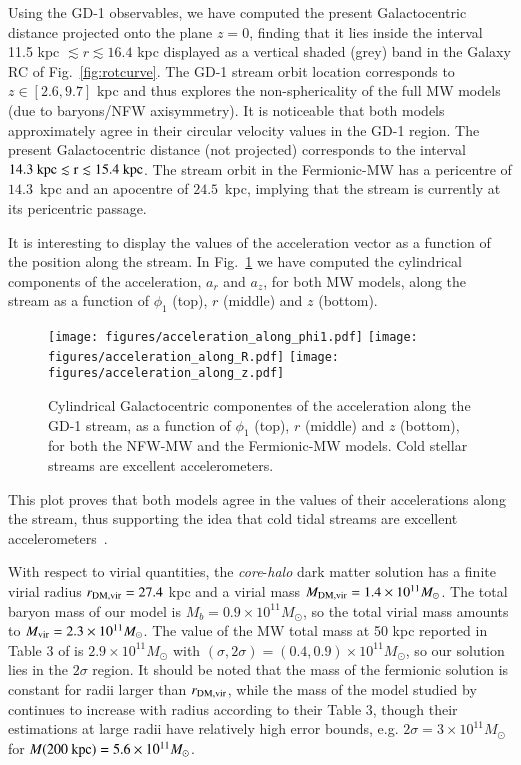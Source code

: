 \documentclass[twocolumn]{aa}
\begin{document}
Using the GD-1 observables, we have computed the present Galactocentric distance projected onto the plane $z=0$, finding that it lies inside the interval 11.5 kpc $\lesssim r \lesssim 16.4$ kpc displayed as a vertical shaded (grey) band in the Galaxy RC of Fig.~\ref{fig:rotcurve}. The GD-1 stream orbit location corresponds to $z\in [2.6, 9.7]$ kpc and thus explores the non-sphericality of the full MW models (due to baryons/NFW axisymmetry).
It is noticeable that both models approximately agree in their circular velocity values in the GD-1 region.
The present Galactocentric distance (not projected) corresponds to the interval $14.3~\rm{kpc} \lesssim r \lesssim 15.4~\rm{kpc}$. The stream orbit in the Fermionic-MW has a pericentre of $14.3$~kpc and an apocentre
of $24.5$~kpc, implying that the stream is currently at its pericentric passage.

It is interesting to display the values of the acceleration vector as a function of the position along the stream.
In Fig.~\ref{fig:acceleration} we have computed the cylindrical components of the acceleration, $a_r$ and $a_z$,
for both MW models, along the stream as a function of $\phi_1$ (top), $r$ (middle) and $z$ (bottom).
\begin{figure}
   \centering
   \texttt{[image: figures/acceleration\_along\_phi1.pdf]}
   \texttt{[image: figures/acceleration\_along\_R.pdf]}
   \texttt{[image: figures/acceleration\_along\_z.pdf]}
   \caption{Cylindrical Galactocentric componentes of the acceleration along the GD-1 stream,
   as a function of $\phi_1$ (top), $r$ (middle) and $z$ (bottom), for both the NFW-MW and the
   Fermionic-MW models. Cold stellar streams are excellent accelerometers.}
   \label{fig:acceleration}
\end{figure}
This plot proves that both models agree in the values of their accelerations along the stream, thus supporting the idea that cold tidal streams are excellent accelerometers~\citep{Ibata_2016,2022ApJ...940...22N,2023ApJ...945L..32C}.

With respect to virial quantities, the \textit{core}-\textit{halo} dark matter solution has a finite virial radius $r_{\rm{DM,vir}}=27.4$ kpc and a virial mass
$M_{\rm{DM,vir}}=1.4\times10^{11} M_\odot$. The total baryon mass of our model is $M_b=0.9\times10^{11}M_\odot$, so the total virial mass amounts to
$M_{\rm{vir}}=2.3\times10^{11} M_\odot$. The value of the MW total mass at 50 kpc reported in Table 3
of \citet{2014MNRAS.445.3788G} is $2.9\times10^{11} M_\odot$ with $(\sigma, 2\sigma)=(0.4,0.9)\times10^{11} M_\odot$, so our solution lies in the $2\sigma$ region.
It should be noted that the mass of the fermionic solution is constant for radii larger than
$r_{\rm{DM,vir}}$, while the mass of the model studied by \citet{2014MNRAS.445.3788G} continues to increase with radius according to their Table 3, though their estimations at large radii have relatively
high error bounds, e.g. $2\sigma=3\times10^{11} M_\odot$ for $M(200 \hbox{ kpc}) =5.6\times10^{11} M_\odot$.
\end{document}

